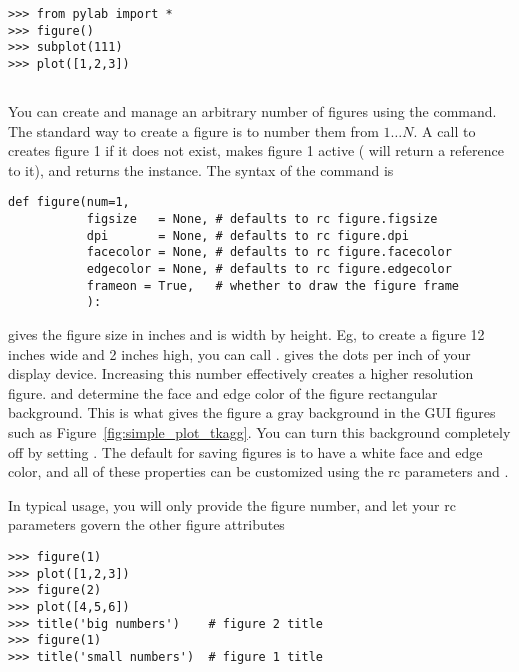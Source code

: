 \documentclass[twoside]{book}
\begin{document}
\begin{lstlisting}
>>> from pylab import *
>>> figure()
>>> subplot(111)
>>> plot([1,2,3])
\end{lstlisting}

\subsection{}
\label{sec:figure}

You can create and manage an arbitrary number of figures using the
 command.  The standard way to create a figure is to
number them from $1 \dots N$.  A call to  creates
figure 1 if it does not exist, makes figure 1 active ( will
return a reference to it), and returns the
 instance.  The syntax of the
 command is

\begin{lstlisting}
def figure(num=1,
           figsize   = None, # defaults to rc figure.figsize
           dpi       = None, # defaults to rc figure.dpi
           facecolor = None, # defaults to rc figure.facecolor
           edgecolor = None, # defaults to rc figure.edgecolor
           frameon = True,   # whether to draw the figure frame
           ):
\end{lstlisting}
 gives the figure size in inches and is width by
height.  Eg, to create a figure 12 inches wide and 2 inches high, you
can call .   gives the dots per
inch of your display device.  Increasing this number effectively
creates a higher resolution figure.   and
 determine the face and edge color of the figure
rectangular background.  This is what gives the figure a gray
background in the GUI figures such as
Figure~\ref{fig:simple_plot_tkagg}.  You can turn this background
completely off by setting .  The default for
saving figures is to have a white face and edge color, and all of
these properties can be customized using the rc parameters
 and .

In typical usage, you will only provide the figure number, and let
your rc parameters govern the other figure attributes

\begin{lstlisting}
>>> figure(1)
>>> plot([1,2,3])
>>> figure(2)
>>> plot([4,5,6])
>>> title('big numbers')    # figure 2 title
>>> figure(1)
>>> title('small numbers')  # figure 1 title
\end{lstlisting}
\end{document}
